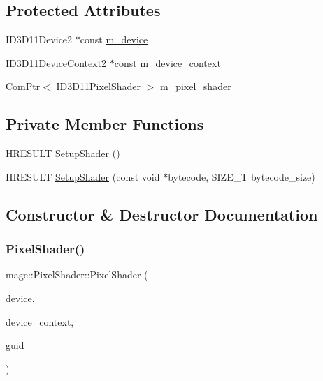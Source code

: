 \subsection*{Protected Attributes}
\begin{DoxyCompactItemize}
\item 
I\+D3\+D11\+Device2 $\ast$const \hyperlink{classmage_1_1_pixel_shader_a7fa34f27d8f39db2403edac28ddecc68}{m\+\_\+device}
\item 
I\+D3\+D11\+Device\+Context2 $\ast$const \hyperlink{classmage_1_1_pixel_shader_a6b9bbf18f255b061fb75453f32a78720}{m\+\_\+device\+\_\+context}
\item 
\hyperlink{namespacemage_ae74f374780900893caa5555d1031fd79}{Com\+Ptr}$<$ I\+D3\+D11\+Pixel\+Shader $>$ \hyperlink{classmage_1_1_pixel_shader_a1dd0f87be1c1f7fe5a1bb2737263222f}{m\+\_\+pixel\+\_\+shader}
\end{DoxyCompactItemize}
\subsection*{Private Member Functions}
\begin{DoxyCompactItemize}
\item 
H\+R\+E\+S\+U\+LT \hyperlink{classmage_1_1_pixel_shader_adb9c1f330ef9958a7fc46c40c98a2b57}{Setup\+Shader} ()
\item 
H\+R\+E\+S\+U\+LT \hyperlink{classmage_1_1_pixel_shader_a3df5b0c0eee682dad0406409e6df2a11}{Setup\+Shader} (const void $\ast$bytecode, S\+I\+Z\+E\+\_\+T bytecode\+\_\+size)
\end{DoxyCompactItemize}


\subsection{Constructor \& Destructor Documentation}
\hypertarget{classmage_1_1_pixel_shader_abf1a5e4a5a550553aea1427e80cd9403}{}\label{classmage_1_1_pixel_shader_abf1a5e4a5a550553aea1427e80cd9403} 
\subsubsection{\texorpdfstring{Pixel\+Shader()}{PixelShader()}\hspace{0.1cm}{\footnotesize\ttfamily [1/4]}}
{\footnotesize\ttfamily mage\+::\+Pixel\+Shader\+::\+Pixel\+Shader (\begin{DoxyParamCaption}\item[{I\+D3\+D11\+Device2 $\ast$}]{device,  }\item[{I\+D3\+D11\+Device\+Context2 $\ast$}]{device\+\_\+context,  }\item[{const wstring \&}]{guid }\end{DoxyParamCaption})\hspace{0.3cm}{\ttfamily [explicit]}}

